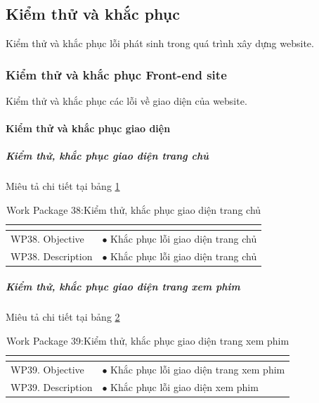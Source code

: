 \documentclass[a4paper]{book}
\begin{document}
\subsection{Kiểm thử và khắc phục} Kiểm thử và khắc phục lỗi phát sinh trong quá trình xây dựng website.
\subsubsection{Kiểm thử và khắc phục Front-end site} Kiểm thử và khắc phục các lỗi về giao diện của website.
\paragraph{Kiểm thử và khắc phục giao diện}
\subparagraph{Kiểm thử, khắc phục giao diện trang chủ} Miêu tả chi tiết tại bảng \ref{table:kt_kp_giaodien_trangchu}
\begin{table}[h!]
	\begin{center}
		\begin{tabular}{|p{4cm}|p{10cm}|}
			\hline
			\multicolumn{2}{|c|}{\cellcolor[HTML]{363636}{\color[HTML]{FFFFFF}Work package 38: Kiểm thử, khắc phục giao diện trang chủ}}\\
			\hline
			\multirow{1}{*}{WP38. Objective} & $\bullet$ Khắc phục lỗi giao diện trang chủ\\
			\hline
			\multirow{1}{*}{WP38. Description} & $\bullet$ Khắc phục lỗi giao diện trang chủ \\
			\hline
		\end{tabular}
		\caption{Work Package 38:Kiểm thử, khắc phục giao diện trang chủ}
		\label{table:kt_kp_giaodien_trangchu}
	\end{center}
\end{table}
\subparagraph{Kiểm thử, khắc phục giao diện trang xem phim} Miêu tả chi tiết tại bảng \ref{table:kt_kp_giaodien_xemphim}
\begin{table}[h!]
	\begin{center}
		\begin{tabular}{|p{4cm}|p{10cm}|}
			\hline
			\multicolumn{2}{|c|}{\cellcolor[HTML]{363636}{\color[HTML]{FFFFFF}Work package 39: Kiểm thử, khắc phục giao diện trang xem phim}}\\
			\hline
			\multirow{1}{*}{WP39. Objective} & $\bullet$ Khắc phục lỗi giao diện trang xem phim\\
			\hline
			\multirow{1}{*}{WP39. Description} & $\bullet$ Khắc phục lỗi giao diện xem phim \\
			\hline
		\end{tabular}
		\caption{Work Package 39:Kiểm thử, khắc phục giao diện trang xem phim}
		\label{table:kt_kp_giaodien_xemphim}
	\end{center}
\end{table}
\end{document}
